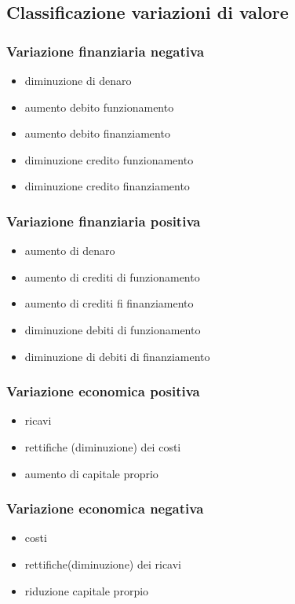 \subsection{Classificazione variazioni di valore}
\subsubsection{Variazione finanziaria negativa}
\begin{itemize}
    \item diminuzione di denaro
    \item aumento debito funzionamento
    \item aumento debito finanziamento
    \item diminuzione credito funzionamento
    \item diminuzione credito finanziamento
\end{itemize}

\subsubsection{Variazione finanziaria positiva}
\begin{itemize}
    \item aumento di denaro
    \item aumento di crediti di funzionamento
    \item aumento di crediti fi finanziamento
    \item diminuzione debiti di funzionamento 
    \item diminuzione di debiti di finanziamento
\end{itemize}

\subsubsection{Variazione economica positiva}
\begin{itemize}
    \item ricavi
    \item rettifiche (diminuzione) dei costi
    \item aumento di capitale proprio
\end{itemize}

\subsubsection{Variazione economica negativa}
\begin{itemize}
    \item costi
    \item rettifiche(diminuzione) dei ricavi
    \item riduzione capitale prorpio
\end{itemize}

